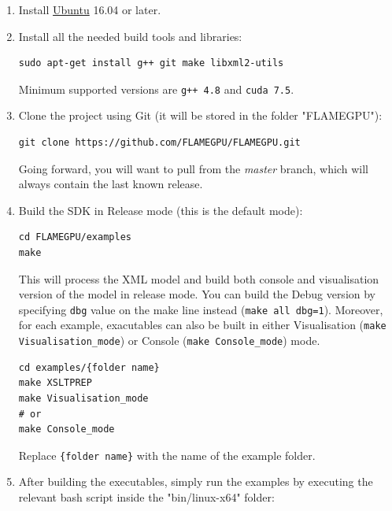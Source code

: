 \documentclass[11pt, a4paper, onecolumn, oneside]{report}
\begin{document}
\begin{enumerate}
\item Install \href{http://www.ubuntu.com/download}{Ubuntu} 16.04 or later. 
\item Install all the needed build tools and libraries:  
    
\begin{verbatim}
sudo apt-get install g++ git make libxml2-utils
\end{verbatim}

Minimum supported versions are \verb|g++ 4.8| and \verb|cuda 7.5|.

\item Clone the project using Git (it will be stored in the folder "FLAMEGPU"):  

\begin{verbatim}
git clone https://github.com/FLAMEGPU/FLAMEGPU.git
\end{verbatim}

Going forward, you will want to pull from the \textit{master} branch, which will always contain the last known release.

\item Build the SDK in Release mode (this is the default mode):

\begin{verbatim}
cd FLAMEGPU/examples
make
\end{verbatim}

This will process the XML model and build both console and visualisation version of the model in release mode. You can build the Debug version by specifying \verb|dbg| value on the make line instead (\verb|make all dbg=1|).  Moreover, for each example, exacutables can also be built in either Visualisation (\verb|make Visualisation_mode|) or Console (\verb|make Console_mode|) mode.

\begin{verbatim}
cd examples/{folder name}
make XSLTPREP
make Visualisation_mode
# or
make Console_mode
\end{verbatim}

Replace \verb|{folder name}| with the name of the example folder.

\item  After building the executables, simply run the examples by executing the relevant bash script inside the "bin/linux-x64" folder:


\end{enumerate}
\end{document}
